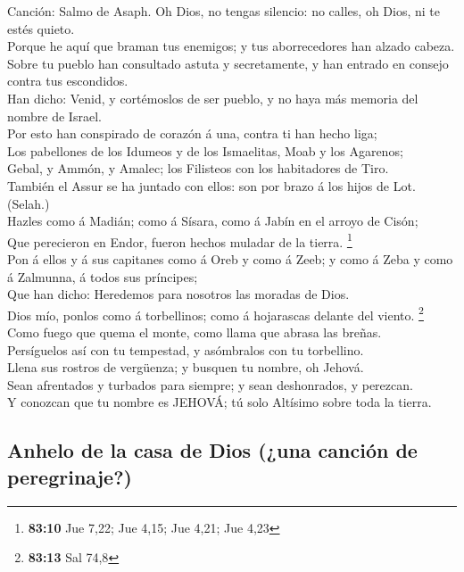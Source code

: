  Canción: Salmo de Asaph. Oh Dios, no tengas silencio: no
calles, oh Dios, ni te estés quieto.\\
 Porque he aquí que braman tus enemigos; y tus
aborrecedores han alzado cabeza.\\
 Sobre tu pueblo han consultado astuta y secretamente, y
han entrado en consejo contra tus escondidos.\\
 Han dicho: Venid, y cortémoslos de ser pueblo, y no haya
más memoria del nombre de Israel.\\
 Por esto han conspirado de corazón á una, contra ti han
hecho liga;\\
 Los pabellones de los Idumeos y de los Ismaelitas, Moab y
los Agarenos;\\
 Gebal, y Ammón, y Amalec; los Filisteos con los
habitadores de Tiro.\\
 También el Assur se ha juntado con ellos: son por brazo á
los hijos de Lot. (Selah.)\\
 Hazles como á Madián; como á Sísara, como á Jabín en el
arroyo de Cisón;\\
 Que perecieron en Endor, fueron hechos muladar de la
tierra. \footnote{\textbf{83:10} Jue 7,22; Jue 4,15; Jue 4,21; Jue 4,23}\\
 Pon á ellos y á sus capitanes como á Oreb y como á Zeeb;
y como á Zeba y como á Zalmunna, á todos sus príncipes;\\
 Que han dicho: Heredemos para nosotros las moradas de
Dios.\\
 Dios mío, ponlos como á torbellinos; como á hojarascas
delante del viento. \footnote{\textbf{83:13} Sal 74,8}\\
 Como fuego que quema el monte, como llama que abrasa las
breñas.\\
 Persíguelos así con tu tempestad, y asómbralos con tu
torbellino.\\
 Llena sus rostros de vergüenza; y busquen tu nombre, oh
Jehová.\\
 Sean afrentados y turbados para siempre; y sean
deshonrados, y perezcan.\\
 Y conozcan que tu nombre es JEHOVÁ; tú solo Altísimo
sobre toda la tierra.

\hypertarget{anhelo-de-la-casa-de-dios-una-canciuxf3n-de-peregrinaje}{%
\subsection{Anhelo de la casa de Dios (¿una canción de
peregrinaje?)}\label{anhelo-de-la-casa-de-dios-una-canciuxf3n-de-peregrinaje}}

